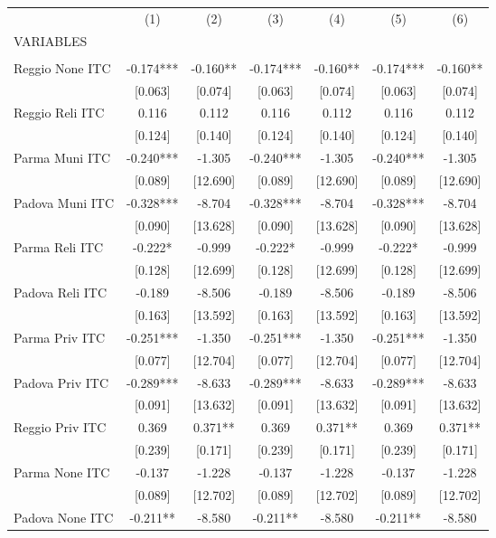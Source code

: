 \begin{tabular}{lcccccc} \hline
 & (1) & (2) & (3) & (4) & (5) & (6) \\
VARIABLES &  &  &  &  &  &  \\ \hline
 &  &  &  &  &  &  \\
Reggio None ITC & -0.174*** & -0.160** & -0.174*** & -0.160** & -0.174*** & -0.160** \\
 & [0.063] & [0.074] & [0.063] & [0.074] & [0.063] & [0.074] \\
Reggio Reli ITC & 0.116 & 0.112 & 0.116 & 0.112 & 0.116 & 0.112 \\
 & [0.124] & [0.140] & [0.124] & [0.140] & [0.124] & [0.140] \\
Parma Muni ITC & -0.240*** & -1.305 & -0.240*** & -1.305 & -0.240*** & -1.305 \\
 & [0.089] & [12.690] & [0.089] & [12.690] & [0.089] & [12.690] \\
Padova Muni ITC & -0.328*** & -8.704 & -0.328*** & -8.704 & -0.328*** & -8.704 \\
 & [0.090] & [13.628] & [0.090] & [13.628] & [0.090] & [13.628] \\
Parma Reli ITC & -0.222* & -0.999 & -0.222* & -0.999 & -0.222* & -0.999 \\
 & [0.128] & [12.699] & [0.128] & [12.699] & [0.128] & [12.699] \\
Padova Reli ITC & -0.189 & -8.506 & -0.189 & -8.506 & -0.189 & -8.506 \\
 & [0.163] & [13.592] & [0.163] & [13.592] & [0.163] & [13.592] \\
Parma Priv ITC & -0.251*** & -1.350 & -0.251*** & -1.350 & -0.251*** & -1.350 \\
 & [0.077] & [12.704] & [0.077] & [12.704] & [0.077] & [12.704] \\
Padova Priv ITC & -0.289*** & -8.633 & -0.289*** & -8.633 & -0.289*** & -8.633 \\
 & [0.091] & [13.632] & [0.091] & [13.632] & [0.091] & [13.632] \\
Reggio Priv ITC & 0.369 & 0.371** & 0.369 & 0.371** & 0.369 & 0.371** \\
 & [0.239] & [0.171] & [0.239] & [0.171] & [0.239] & [0.171] \\
Parma None ITC & -0.137 & -1.228 & -0.137 & -1.228 & -0.137 & -1.228 \\
 & [0.089] & [12.702] & [0.089] & [12.702] & [0.089] & [12.702] \\
Padova None ITC & -0.211** & -8.580 & -0.211** & -8.580 & -0.211** & -8.580 \\

\end{tabular}
